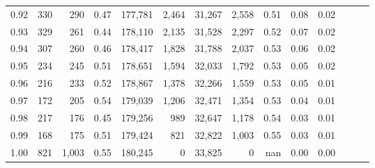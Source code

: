 \begin{tabular}{rrrrrrrrrrrrrr}
0.92 &    330 &    290 &  0.47 &  177,781 &    2,464 &  31,267 &   2,558 &  0.51 &  0.08 &      0.02 \\
0.93 &    329 &    261 &  0.44 &  178,110 &    2,135 &  31,528 &   2,297 &  0.52 &  0.07 &      0.02 \\
0.94 &    307 &    260 &  0.46 &  178,417 &    1,828 &  31,788 &   2,037 &  0.53 &  0.06 &      0.02 \\
0.95 &    234 &    245 &  0.51 &  178,651 &    1,594 &  32,033 &   1,792 &  0.53 &  0.05 &      0.02 \\
0.96 &    216 &    233 &  0.52 &  178,867 &    1,378 &  32,266 &   1,559 &  0.53 &  0.05 &      0.01 \\
0.97 &    172 &    205 &  0.54 &  179,039 &    1,206 &  32,471 &   1,354 &  0.53 &  0.04 &      0.01 \\
0.98 &    217 &    176 &  0.45 &  179,256 &      989 &  32,647 &   1,178 &  0.54 &  0.03 &      0.01 \\
0.99 &    168 &    175 &  0.51 &  179,424 &      821 &  32,822 &   1,003 &  0.55 &  0.03 &      0.01 \\
1.00 &    821 &  1,003 &  0.55 &  180,245 &        0 &  33,825 &       0 &   nan &  0.00 &      0.00 \\
\bottomrule
\end{tabular}
